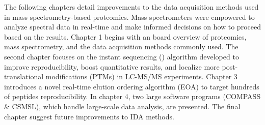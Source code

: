 The following chapters detail improvements to the data acquisition methods used in mass spectrometry-based proteomics. Mass spectrometers were empowered to analyze spectral data in real-time and make informed decisions on how to proceed based on the results. Chapter 1 begins with an board overview of proteomics, mass spectrometry, and the data acquisition methods commonly used. The second chapter focuses on the instant sequencing (\inseq{}) algorithm developed to improve reproducibility, boost quantitative results, and localize more post-translational modifications (PTMs) in LC-MS/MS experiments. Chapter 3 introduces a novel real-time elution ordering algorithm (EOA) to target hundreds of peptides reproducibility. In chapter 4, two large software programs (COMPASS \& CSMSL), which handle large-scale data analysis, are presented. The final chapter suggest future improvements to IDA methods.